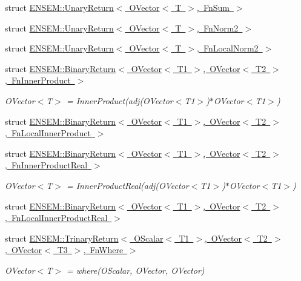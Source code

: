 \begin{DoxyCompactItemize}
\item 
struct \mbox{\hyperlink{structENSEM_1_1UnaryReturn_3_01OVector_3_01T_01_4_00_01FnSum_01_4}{E\+N\+S\+E\+M\+::\+Unary\+Return$<$ O\+Vector$<$ T $>$, Fn\+Sum $>$}}
\item 
struct \mbox{\hyperlink{structENSEM_1_1UnaryReturn_3_01OVector_3_01T_01_4_00_01FnNorm2_01_4}{E\+N\+S\+E\+M\+::\+Unary\+Return$<$ O\+Vector$<$ T $>$, Fn\+Norm2 $>$}}
\item 
struct \mbox{\hyperlink{structENSEM_1_1UnaryReturn_3_01OVector_3_01T_01_4_00_01FnLocalNorm2_01_4}{E\+N\+S\+E\+M\+::\+Unary\+Return$<$ O\+Vector$<$ T $>$, Fn\+Local\+Norm2 $>$}}
\item 
struct \mbox{\hyperlink{structENSEM_1_1BinaryReturn_3_01OVector_3_01T1_01_4_00_01OVector_3_01T2_01_4_00_01FnInnerProduct_01_4}{E\+N\+S\+E\+M\+::\+Binary\+Return$<$ O\+Vector$<$ T1 $>$, O\+Vector$<$ T2 $>$, Fn\+Inner\+Product $>$}}
\begin{DoxyCompactList}\small\item\em O\+Vector$<$\+T$>$ = Inner\+Product(adj(\+O\+Vector$<$\+T1$>$)$\ast$\+O\+Vector$<$\+T1$>$) \end{DoxyCompactList}\item 
struct \mbox{\hyperlink{structENSEM_1_1BinaryReturn_3_01OVector_3_01T1_01_4_00_01OVector_3_01T2_01_4_00_01FnLocalInnerProduct_01_4}{E\+N\+S\+E\+M\+::\+Binary\+Return$<$ O\+Vector$<$ T1 $>$, O\+Vector$<$ T2 $>$, Fn\+Local\+Inner\+Product $>$}}
\item 
struct \mbox{\hyperlink{structENSEM_1_1BinaryReturn_3_01OVector_3_01T1_01_4_00_01OVector_3_01T2_01_4_00_01FnInnerProductReal_01_4}{E\+N\+S\+E\+M\+::\+Binary\+Return$<$ O\+Vector$<$ T1 $>$, O\+Vector$<$ T2 $>$, Fn\+Inner\+Product\+Real $>$}}
\begin{DoxyCompactList}\small\item\em O\+Vector$<$\+T$>$ = Inner\+Product\+Real(adj(\+O\+Vector$<$\+T1$>$)$\ast$\+O\+Vector$<$\+T1$>$) \end{DoxyCompactList}\item 
struct \mbox{\hyperlink{structENSEM_1_1BinaryReturn_3_01OVector_3_01T1_01_4_00_01OVector_3_01T2_01_4_00_01FnLocalInnerProductReal_01_4}{E\+N\+S\+E\+M\+::\+Binary\+Return$<$ O\+Vector$<$ T1 $>$, O\+Vector$<$ T2 $>$, Fn\+Local\+Inner\+Product\+Real $>$}}
\item 
struct \mbox{\hyperlink{structENSEM_1_1TrinaryReturn_3_01OScalar_3_01T1_01_4_00_01OVector_3_01T2_01_4_00_01OVector_3_01T3_01_4_00_01FnWhere_01_4}{E\+N\+S\+E\+M\+::\+Trinary\+Return$<$ O\+Scalar$<$ T1 $>$, O\+Vector$<$ T2 $>$, O\+Vector$<$ T3 $>$, Fn\+Where $>$}}
\begin{DoxyCompactList}\small\item\em O\+Vector$<$\+T$>$ = where(\+O\+Scalar, O\+Vector, O\+Vector) \end{DoxyCompactList}\end{DoxyCompactItemize}
